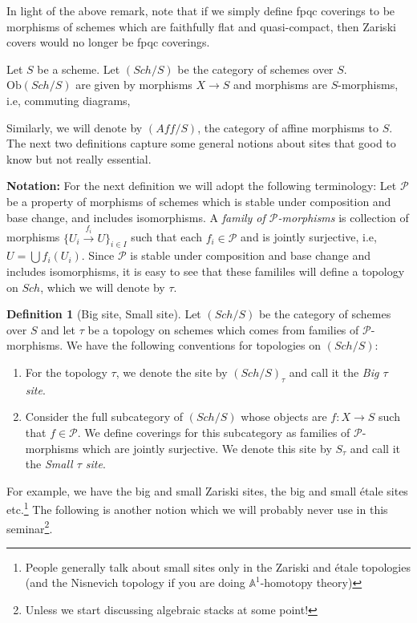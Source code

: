 \documentclass[11pt]{amsart}
\newcommand{\A}{{\mathbb A}}
\newcommand{\Ob}{\text{Ob}}
\theoremstyle{definition}
\newtheorem{definition}[theorem]{Definition}
\begin{document}
In light of the above remark, note that if we simply define fpqc coverings to be morphisms of schemes which are faithfully flat and quasi-compact, then Zariski covers would no longer be fpqc coverings.


Let $S$ be a scheme. Let $(\mathit{Sch}/S)$ be the category of schemes over $S$. $\Ob(\mathit{Sch}/S)$ are given by morphisms $X\rightarrow S$ and morphisms are $S$-morphisms, i.e, commuting diagrams,
\begin{center}
\end{center}
Similarly, we will denote by $(\mathit{Aff}/S)$, the category of affine morphisms to $S$.\\

The next two definitions capture some general notions about sites that good to know but not really essential.

\noindent\textbf{Notation:} For the next definition we will adopt the following terminology: Let $\mathcal{P}$ be a property of morphisms of schemes which is stable under composition and base change, and includes isomorphisms. A \textit{family of $\mathcal{P}$-morphisms} is collection of morphisms $\{U_i \overset{f_i}{\to} U\}_{i\in I}$ such that each $f_i\in \mathcal{P}$ and is jointly surjective, i.e, $U = \bigcup f_i(U_i)$. Since $\mathcal{P}$ is stable under composition and base change and includes isomorphisms, it is easy to see that these famililes will define a topology on $\mathit{Sch}$, which we will denote by $\tau$.


\begin{definition}[Big site, Small site]
	Let $(\mathit{Sch}/S)$ be the category of schemes over $S$ and let $\tau$ be a topology on schemes which comes from families of $\mathcal{P}$-morphisms. We have the following conventions for topologies on $(\mathit{Sch}/S)$:
	\begin{enumerate}
		\item[\textsc{Big site:}] For the topology $\tau$, we denote the site by $(\mathit{Sch}/S)_{\tau}$ and call it the \textit{Big $\tau$ site}.
		\item[\textsc{Small site:}] Consider the full subcategory of $(\mathit{Sch}/S)$ whose objects are $f: X\rightarrow S$ such that $f\in\mathcal{P}$. We define coverings for this subcategory as families of $\mathcal{P}$-morphisms which are jointly surjective. We denote this site by $S_{\tau}$ and call it the \textit{Small $\tau$ site}.
	\end{enumerate}
\end{definition}
For example, we have the big and small Zariski sites, the big and small \'{e}tale sites etc.\footnote{People generally talk about small sites only in the Zariski and \'{e}tale topologies (and the Nisnevich topology if you are doing $\A^1$-homotopy theory)} The following is another notion which we will probably never use in this seminar\footnote{Unless we start discussing algebraic stacks at some point!}.
\end{document}

